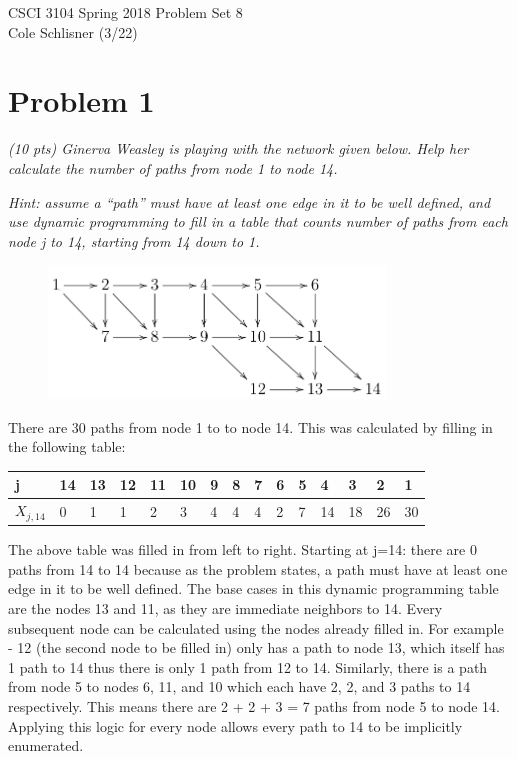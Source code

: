 \documentclass[12pt]{article} \setlength{\oddsidemargin}{0in}
\begin{document}
\noindent CSCI 3104 Spring 2018 \hfill Problem Set 8\\
Cole Schlisner (3/22)

\graphicspath{ {images/} }

\hrulefill

{\selectfont}

\section*{Problem 1}

\textit{(10 pts) Ginerva Weasley is playing with the network given
  below. Help her calculate the number of paths from node 1 to node
  14.}

\textit{Hint: assume a ``path'' must have at least one edge in it to
  be well defined, and use dynamic programming to fill in a table that
  counts number of paths from each node j to 14, starting from 14 down
  to 1.}


\begin{figure}[h]
  \centering \includegraphics[width=0.8\textwidth]{P1}
\end{figure}

There are 30 paths from node 1 to to node 14. 
This was calculated by filling in the following table:


\begin{tabular}{ |p{1cm}||p{.5cm}|p{.5cm}|p{.5cm}|p{.5cm}|p{.5cm}|p{.5cm}|p{.5cm}|p{.5cm}|p{.5cm}|p{.5cm}|p{.5cm}|p{.5cm}|p{.5cm}|p{.5cm}| }
 \hline
  j &14&13&12&11&10&9&8&7&6&5&4&3&2&1   \\
 \hline
 \hline
  $X_{j,14}$ &0&1&1&2&3&4&4&4&2&7&14&18&26&30 \\
 \hline
\end{tabular}

The above table was filled in from left to right. Starting at j=14: there are 0 paths from 14 to 14 because as the problem states, a path must have at least one edge in it to be well defined. The base cases in this dynamic programming table are the nodes 13 and 11, as they are immediate neighbors to 14. Every subsequent node can be calculated using the nodes already filled in. For example - 12 (the second node to be filled in) only has a path to node 13, which itself has 1 path to 14 thus there is only 1 path from 12 to 14. Similarly, there is a path from node 5 to nodes 6, 11, and 10 which each have 2, 2, and 3 paths to 14 respectively. This means there are 2 + 2 + 3 = 7 paths from node 5 to node 14. Applying this logic for every node allows every path to 14 to be implicitly enumerated. 
\end{document}
